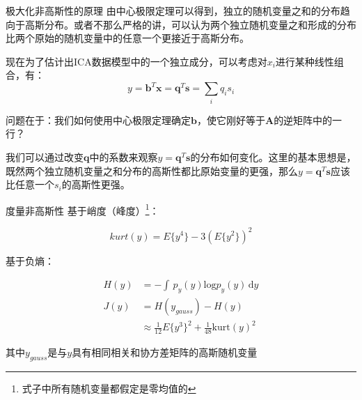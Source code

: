 \documentclass{beamer}
\begin{document}
\begin{frame}{极大化非高斯性的原理}
由中心极限定理可以得到，独立的随机变量之和的分布趋向于高斯分布。或者不那么严格的讲，可以认为两个独立随机变量之和形成的分布比两个原始的随机变量中的任意一个更接近于高斯分布。

现在为了估计出ICA数据模型中的一个独立成分，可以考虑对$x_i$进行某种线性组合，有：
\begin{equation}
y=\mathbf{b}^T\mathbf{x}=\mathbf{q}^T\mathbf{s}=\sum_{i}q_is_i
\end{equation}

问题在于：我们如何使用中心极限定理确定$\mathbf{b}$，使它刚好等于$\mathbf{A}$的逆矩阵中的一行？

我们可以通过改变$\mathbf{q}$中的系数来观察$y=\mathbf{q}^T\mathbf{s}$的分布如何变化。这里的基本思想是，既然两个独立随机变量之和分布的高斯性都比原始变量的更强，那么$y=\mathbf{q}^T\mathbf{s}$应该比任意一个$s_i$的高斯性更强。
\end{frame}

\begin{frame}{度量非高斯性}
基于峭度（峰度）\footnote{式子中所有随机变量都假定是零均值的}：

\begin{equation}
kurt(y)=E\{y^4\}-3(E\{y^2\})^2
\end{equation}

基于负熵：

\begin{align}
H(y)&=-\int \, p_y(y)\mathrm{log}p_y(y)\,\mathrm{d}y\\
J(y)&=H(y_{gauss})-H(y)\\
            &\approx \frac{1}{12}E\{y^3\}^2+\frac{1}{48}\mathrm{kurt}(y)^2
\end{align}

其中$y_{gauss}$是与$y$具有相同相关和协方差矩阵的高斯随机变量

\end{frame}
\end{document}
